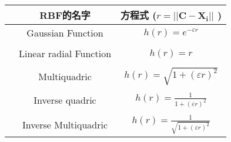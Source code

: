 \begin{tabular}{ccc}
\toprule
  & RBF的名字 & 方程式 (\(r = ||\mathbf{C-X_i}||\) )   \\ 
\midrule
  & Gaussian Function  & \(h(r) = e^{-\varepsilon r}\)      \\ \\ 
  & Linear radial Function  & \(h(r) = r\)      \\ \\
  & Multiquadric   & \(h(r) = \sqrt{1+(\varepsilon r)^2}\)       \\ \\
  & Inverse quadric  &  \(h(r) = \frac{1}{1+(\varepsilon r)^2}\)     \\ \\ 
  & Inverse Multiquadric  &  \(h(r) = \frac{1}{\sqrt{1+(\varepsilon r)^2}}\)     \\
\bottomrule
\end{tabular}

